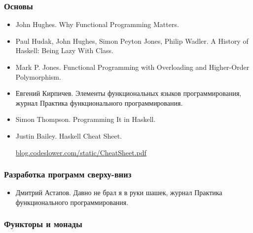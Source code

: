 

\subsubsection{Основы}

\begin{itemize}
\item John Hughes. Why Functional Programming Matters.

\item Paul Hudak, John Hughes, Simon Peyton Jones, Philip Wadler.
    A History of Haskell: Being Lazy With Class.

\item Mark P. Jones. Functional Programming with Overloading
    and Higher-Order Polymorphism.

\item Евгений Кирпичев. Элементы функциональных 
    языков программирования, журнал Практика функционального
    программирования.

\item Simon Thompson. Programming It in Haskell.

\item Justin Bailey. Haskell Cheat Sheet.

    \url{blog.codeslower.com/static/CheatSheet.pdf}

\end{itemize}


\subsubsection{Разработка программ сверху-вниз}

\begin{itemize}
\item Дмитрий Астапов. Давно не брал я в руки шашек,
    журнал Практика функционального программирования.
\end{itemize}


\subsubsection{Функторы и монады}

